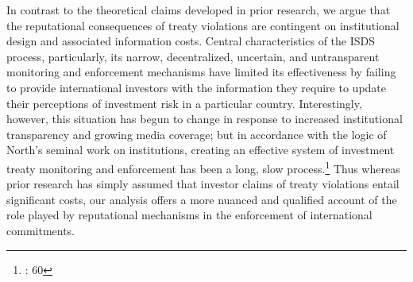 \documentclass[12pt,onesided]{amsart}
\begin{document}
In contrast to the theoretical claims developed in prior research, we argue that the reputational consequences of treaty violations are contingent on institutional design and associated information costs. Central characteristics of the ISDS process, particularly, its narrow, decentralized, uncertain, and untransparent monitoring and enforcement mechanisms have limited its effectiveness by failing to provide international investors with the information they require to update their perceptions of investment risk in a particular country. Interestingly, however, this situation has begun to change in response to increased institutional transparency and growing media coverage; but in accordance with the logic of North's seminal work on institutions, creating an effective system of investment treaty monitoring and enforcement has been a long, slow process.\footnote{\citet{north1990institutions}: 60} Thus whereas prior research has simply assumed that investor claims of treaty violations entail significant costs, our analysis offers a more nuanced and qualified account of the role played by reputational mechanisms in the enforcement of international commitments.


\end{document}
